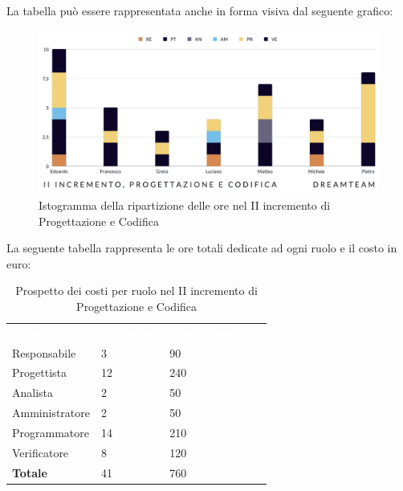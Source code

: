 La tabella può essere rappresentata anche in forma visiva dal seguente grafico:
\begin{figure}[H]
\centering
\includegraphics[scale=0.55]{Sezioni/SezioniPreventivo/grafici/Preventivo_progettazione_II.png}
\caption{Istogramma della ripartizione delle ore nel II incremento di Progettazione e Codifica}
\end{figure}

La seguente tabella rappresenta le ore totali dedicate ad ogni ruolo e il costo in euro:

\begin{table}[H]
\begin{center}
\renewcommand{\arraystretch}{1.5}
\begin{tabular}{ m{}<{\centering}  m{}<{\centering} m{}<{\centering}}
	\rowcolor{darkblue}
	\textcolor{white}{\textbf{Ruolo}}&\textcolor{white}{\textbf{Totale ore}}&\textcolor{white}{\textbf{Costo totale (\euro)}}\\ 

	Responsabile  & 3 & 90 \\	
	
	Progettista & 12 & 240 \\
	
	Analista & 2 & 50 \\

	Amministratore & 2 & 50 \\
	
	Programmatore & 14 & 210 \\
	
	Verificatore & 8 & 120 \\
	
	\textbf{Totale} & 41 & 760 \\
	
\end{tabular}
\caption{Prospetto dei costi per ruolo nel II incremento di Progettazione e Codifica}
\end{center}
\end{table}

